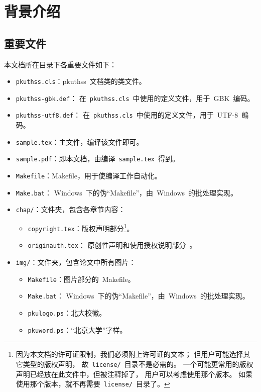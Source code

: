 \chapter{背景介绍}
	\section{重要文件}

	本文档所在目录下各重要文件如下：
	\begin{itemize}\denselist
		\item \verb|pkuthss.cls|：pkuthss~文档类的类文件。
		\item \verb|pkuthss-gbk.def|：
			在~\verb|pkuthss.cls|~中使用的定义文件，用于~GBK~编码。
		\item \verb|pkuthss-utf8.def|：
			在~\verb|pkuthss.cls|~中使用的定义文件，用于~UTF-8~编码。
		\item \verb|sample.tex|：主文件，编译该文件即可。
		\item \verb|sample.pdf|：即本文档，由编译~\verb|sample.tex|~得到。
		\item \verb|Makefile|：Makefile，用于使编译工作自动化。
		\item \verb|Make.bat|：
			Windows~下的伪“Makefile”，由~Windows~的批处理实现。
		\item \verb|chap/|：文件夹，包含各章节内容：
		\begin{itemize}\denselist
			\item \verb|copyright.tex|：版权声明部分\footnote%
			{%
				因为本文档的许可证限制，我们必须附上许可证的文本；
				但用户可能选择其它类型的版权声明，
				故~\texttt{license/}\linebreak[1]~目录不是必需的。
				一个可能更常用的版权声明已经放在此文件中，但被注释掉了，
				用户可以考虑使用那个版本。
				如果使用那个版本，就不再需要~\texttt{license/}~目录了。
			}。
			\item \verb|originauth.tex|：
				原创性声明和使用授权说明部分~\supercite{F11}。
		\end{itemize}
		\item \verb|img/|：文件夹，包含论文中所有图片：
		\begin{itemize}\denselist
			\item \verb|Makefile|：图片部分的~Makefile。
			\item \verb|Make.bat|：
				Windows~下的伪“Makefile”，由~Windows~的批处理实现。
			\item \verb|pkulogo.ps|：北大校徽。
			\item \verb|pkuword.ps|：“北京大学”字样。
		\end{itemize}
	\end{itemize}

